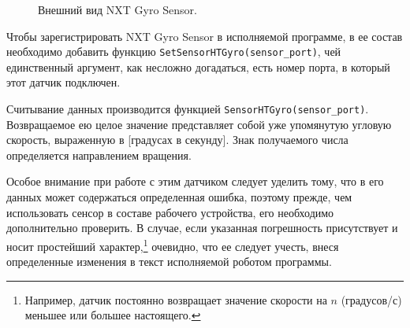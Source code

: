 \documentclass[12pt,a4paper,openany]{extarticle}
\begin{document}
\begin{figure}[h]
	\begin{minipage}[h]{0.49\linewidth}
	\end{minipage}
	\hfill
	\begin{minipage}[h]{0.49\linewidth}
	\end{minipage}
	\caption{Внешний вид NXT Gyro Sensor.}
	\label{sensor}
\end{figure}

Чтобы зарегистрировать NXT Gyro Sensor в исполняемой программе, в ее состав необходимо добавить функцию \verb|SetSensorHTGyro(sensor_port)|, чей единственный аргумент, как несложно догадаться, есть номер порта, в который этот датчик подключен.

Считывание данных производится функцией \verb|SensorHTGyro(sensor_port)|.
Возвращаемое ею целое значение представляет собой уже упомянутую угловую скорость, выраженную в [градусах в секунду].   
Знак получаемого числа определяется направлением вращения.

Особое внимание при работе с этим датчиком следует уделить тому, что в его данных может содержаться определенная ошибка, поэтому прежде, чем использовать сенсор в составе рабочего устройства, его необходимо дополнительно проверить. 
В случае, если указанная погрешность присутствует и носит простейший характер\lefteqn,\footnote{Например, датчик постоянно возвращает значение скорости на $n$ (градусов/с) меньшее или большее настоящего.} очевидно, что ее следует учесть, внеся определенные изменения в текст исполняемой роботом программы.
\end{document}
